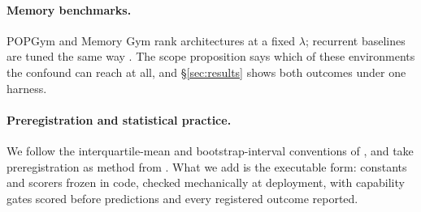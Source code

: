 \paragraph{Memory benchmarks.} POPGym \citep{morad2023popgym} and Memory Gym
\citep{pleines2023memory} rank architectures at a fixed $\lambda$; recurrent
baselines are tuned the same way \citep{hausknecht2015deep,ni2022recurrent}.
The scope proposition says which of these environments the confound can reach
at all, and \S\ref{sec:results} shows both outcomes under one harness.

\paragraph{Preregistration and statistical practice.} We follow the
interquartile-mean and bootstrap-interval conventions of
\citet{agarwal2021deep}, and take preregistration as method from
\citet{nosek2018preregistration}. What we add is the executable form:
constants and scorers frozen in code, checked mechanically at deployment, with
capability gates scored before predictions and every registered outcome
reported.
